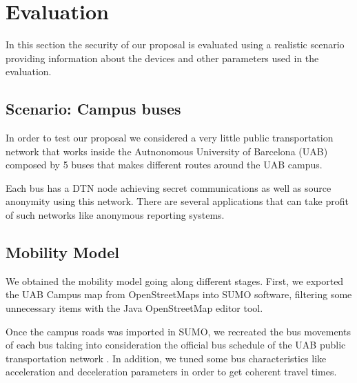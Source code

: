 \section{Evaluation}\label{sec:evaluation}


In this section the security of our proposal is evaluated using a realistic scenario providing information about the devices and other parameters used in the evaluation.

\subsection{Scenario: Campus buses}


In order to test our proposal we considered a very little public transportation network that works inside the Autnonomous University of Barcelona (UAB) composed by 5 buses that makes different routes around the UAB campus.

Each bus has a DTN node achieving secret communications as well as source anonymity using this network. There are several applications that can take profit of such networks like anonymous reporting systems.

\subsection{Mobility Model}


We obtained the mobility model going along different stages. First, we exported the UAB Campus map from OpenStreetMaps into SUMO  software, filtering some unnecessary items with the Java OpenStreetMap editor  tool.

Once the campus roads was imported in SUMO, we recreated the bus movements of each bus taking into consideration the official bus schedule of the UAB public transportation network . In addition, we tuned some bus characteristics like acceleration and deceleration parameters in order to get coherent travel times.

